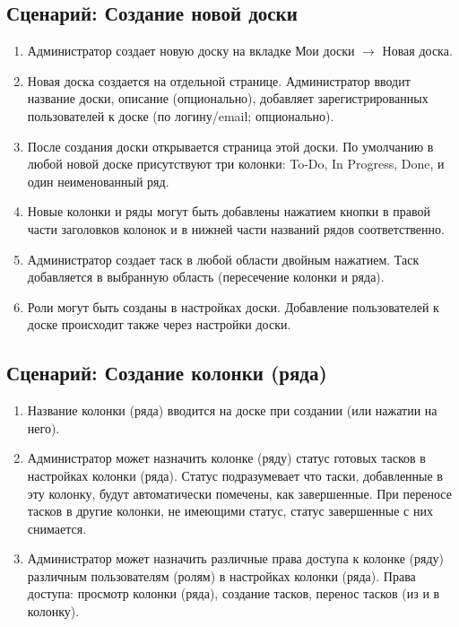 \documentclass{tmcorreport}
\begin{document}
\subsection*{Сценарий: Создание новой доски}
\begin{enumerate}
    \item Администратор создает новую доску на вкладке Мои доски $\to$ Новая доска.
    \item Новая доска создается на отдельной странице. Администратор вводит название доски, описание (опционально), добавляет зарегистрированных пользователей к доске (по логину/email; опционально).
    \item После создания доски открывается страница этой доски. По умолчанию в любой новой доске присутствуют три колонки: To-Do, In Progress, Done, и один неименованный ряд.
    \item Новые колонки и ряды могут быть добавлены нажатием кнопки в правой части заголовков колонок и в нижней части названий рядов соответственно.
    \item Администратор создает таск в любой области двойным нажатием. Таск добавляется в выбранную область (пересечение колонки и ряда).
    \item Роли могут быть созданы в настройках доски. Добавление пользователей к доске происходит также через настройки доски.
\end{enumerate}

\subsection*{Сценарий: Создание колонки (ряда)}
\begin{enumerate}
    \item Название колонки (ряда) вводится на доске при создании (или нажатии на него).
    \item Администратор может назначить колонке (ряду) статус готовых тасков в настройках колонки (ряда). Статус подразумевает что таски, добавленные в эту колонку, будут автоматически помечены, как завершенные. При переносе тасков в другие колонки, не имеющими статус, статус завершенные с них снимается.
    \item Администратор может назначить различные права доступа к колонке (ряду) различным пользователям (ролям) в настройках колонки (ряда). Права доступа: просмотр колонки (ряда), создание тасков, перенос тасков (из и в колонку).
\end{enumerate}
\end{document}
